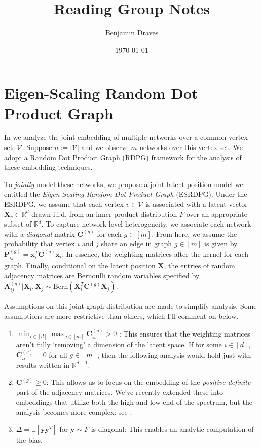 \documentclass{article}
\title{Reading Group Notes}
\author{Benjamin Draves}
\date{\today}
\newcommand{\R}{{\mathbb{R}}}
\newcommand{\E}{{\mathbb{E}}}
\newcommand{\bvar}[1]{\mathbf{#1}}
\theoremstyle{definition}
\numberwithin{Def}{section}
\begin{document}
\maketitle

\section{Eigen-Scaling Random Dot Product Graph}

In \textcite{Draves2020} we analyze the joint embedding of multiple networks over a common vertex set, $\mathcal{V}$. 
Suppose $n := |\mathcal{V}|$ and we observe $m$ networks over this vertex set. 
We adopt a Random Dot Product Graph (RDPG) framework for the analysis of these embedding techniques. 

To \textit{jointly} model these networks, we propose a joint latent position model we entitled the \textit{Eigen-Scaling Random Dot Product Graph} (ESRDPG). 
Under the ESRDPG, we assume that each vertex $v\in\mathcal{V}$ is associated with a latent vector $\bvar{X}_v\in\R^{d}$ drawn i.i.d. from an inner product distribution $F$ over an appropriate subset of $\R^d$. 
To capture network level heterogeneity, we associate each network with a \textit{diagonal} matrix $\bvar{C}^{(g)}$ for each $g\in[m]$.
From here, we assume the probability that vertex $i$ and $j$ share an edge in graph $g\in[m]$ is given by $\bvar{P}_{ij}^{(g)} = \bvar{x}_i^T\bvar{C}^{(g)}\bvar{x}_i$. 
In essence, the weighting matrices alter the kernel for each graph. 
Finally, conditional on the latent position $\bvar{X}$, the entries of random adjacency matrices are Bernoulli random variables specified by $\bvar{A}_{ij}^{(g)}|\bvar{X}_i , \bvar{X}_j \sim \text{Bern}(\bvar{X}_i^T\bvar{C}^{(g)}\bvar{X}_j)$. 

Assumptions on this joint graph distribution are made to simplify analysis. 
Some assumptions are more restrictive than others, which I'll comment on below. 
\begin{enumerate}
\item $\min_{i\in[d]}\max_{g\in[m]}\bvar{C}_{ii}^{(g)} > 0$ : This ensures that the weighting matrices aren't fully `removing' a dimension of the latent space. If for some $i\in[d]$, $\bvar{C}_{ii}^{(g)} = 0$ for all $g\in[m]$, then the following analysis would hold just with results written in $\R^{d-1}$. 
\item $\bvar{C}^{(g)}\geq 0$: This allows us to focus on the embedding of the \textit{positive-definite} part of the adjacency matrices. We've recently extended these into embeddings that utilize both the high and low end of the spectrum, but the analysis becomes more complex: see \textcite{rubindelanchy2017}. 
\item $\Delta = \E[\bvar{yy}^T]$ for $\bvar{y}\sim F$ is diagonal: This enables an analytic computation of the bias.  
\end{enumerate}
\end{document}

